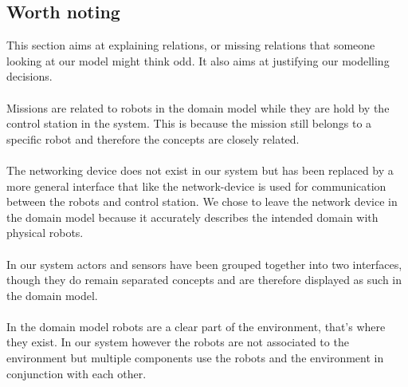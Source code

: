 \subsection{Worth noting}
This section aims at explaining relations, or missing relations that someone looking at our model might think odd. It also aims at justifying our modelling decisions.
\\ \\
Missions are related to robots in the domain model while they are hold by the control station in the system. 
This is because the mission still belongs to a specific robot and therefore the concepts are closely related. 
\\ \\
The networking device does not exist in our system but has been replaced by a more general interface that like the network-device is used for communication between the robots and control station. We chose to leave the network device in the domain model because it accurately describes the intended domain with physical robots.
\\ \\
In our system actors and sensors have been grouped together into two interfaces, though they do remain separated concepts and are therefore displayed as such in the domain model.
\\ \\
In the domain model robots are a clear part of the environment, that's where they exist. In our system however the robots are not associated to the environment but multiple components use the robots and the environment in conjunction with each other.